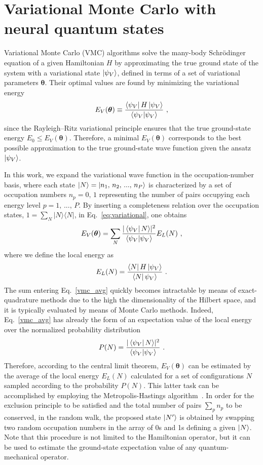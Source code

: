 \documentclass[aps,pre,floatfix,showpacs,twocolumn, preprintnumbers]{revtex4-1}
\begin{document}
\section{Variational Monte Carlo with neural quantum states}\label{sec:VMC}
Variational Monte Carlo (VMC) algorithms solve the many-body Schr\"odinger equation of a given Hamiltonian $H$ by approximating the true ground state of the system with a variational state $\ket{\psi_V}$, defined in terms of a set of variational parameters $\bm \theta$. Their optimal values are found by minimizing the variational energy
\begin{equation}
E_V(\bm\theta) \equiv \frac{\bra{\psi_V}H\ket{\psi_V}}{\braket{\psi_V}}\ ,
\label{eq:variational}
\end{equation}
since the Rayleigh–Ritz variational principle ensures that the true ground-state energy $E_0\leq E_V(\bm \theta)$. Therefore, a minimal $E_V(\bm\theta)$ corresponds to the best possible approximation to the true ground-state wave function given the ansatz $\ket{\psi_V}$.

In this work, we expand the variational wave function in the occupation-number basis, where each state $\ket{N} = \ket{n_1,\,n_2,\,...,\,n_P}$ is characterized by a set of occupation numbers $n_p=0,\,1$ representing the number of pairs occupying each energy level $p=1,\,...,\,P$. By inserting a completeness relation over the occupation states, $1 = \sum_N|N\rangle\langle N|$, in Eq.~\eqref{eq:variational}, one obtains
\begin{align}
\label{vmc_avg}
    E_V(\bm\theta)=\sum_{N}\frac{\vert\bra{\psi_V}N\rangle\vert^2}{\braket{\psi_V}}E_L(N)\ ,
\end{align}
where we define the local energy as
\begin{equation}
E_L(N) = \frac{\bra{N}H\ket{\psi_V}}{\bra{N}\psi_V\rangle}\ .
\end{equation}
The sum entering Eq.~\eqref{vmc_avg} quickly becomes intractable by means of exact-quadrature methods due to the high the dimensionality of the Hilbert space, and it is typically evaluated by means of Monte Carlo methods. Indeed, Eq.~\eqref{vmc_avg} has already the form of an expectation value of the local energy
over the normalized probability distribution
\begin{equation}
P(N)=\frac{\vert\bra{\psi_V}N\rangle\vert^2}{\braket{\psi_V}}\ .
\label{eq:prob_N}
\end{equation}
Therefore, according to the central limit theorem, $E_V(\bm \theta)$ can be estimated by the average of the local energy $E_L(N)$ calculated for a set of configurations $N$ sampled according to the probability $P(N)$. This latter task can be accomplished by employing the Metropolis-Hastings algorithm~\cite{Metropolis:1953,Hastings:1970}. In order for the exclusion principle to be satisfied and the total number of pairs $\sum_p n_p$ to be conserved, in the random walk, the proposed state $\ket{N^\prime}$ is obtained by swapping two random occupation numbers in the array of 0s and 1s defining a given $\ket{N}$. Note that this procedure is not limited to the Hamiltonian operator, but it can be used to estimate the ground-state expectation value of any quantum-mechanical operator.
\end{document}
